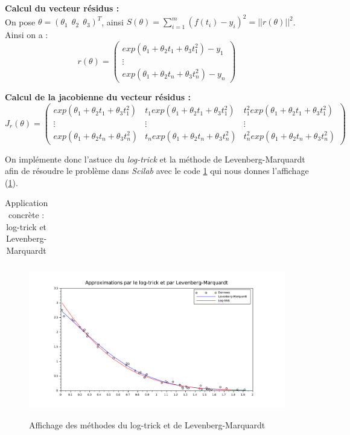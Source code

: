 \documentclass[a4paper,10pt]{report}
\begin{document}
\textbf{Calcul du vecteur résidus :}\\
On pose $\theta = (\theta_1 \ \ \theta_2 \ \ \theta_3)^T$, ainsi $S(\theta)=\sum \limits_{i=1}^m (f(t_i)-y_i)^2=||r(\theta)||^2$.
Ainsi on a :
\abovedisplayskip=0mm
\begin{displaymath}
r(\theta) = \left( \begin{array}{c} exp(\theta_1+\theta_2 t_1 + \theta_3 t_1^2) -y_1 \\
\vdots \\
exp(\theta_1+\theta_2 t_n + \theta_3 t_n^2) -y_n
 \end{array} \right)
\end{displaymath}

\textbf{Calcul de la jacobienne du vecteur résidus :}\\
\abovedisplayskip=0mm
\begin{displaymath}
J_r(\theta) = \left( \begin{array}{ccc} exp(\theta_1+\theta_2 t_1 + \theta_3 t_1^2) & t_1exp(\theta_1+\theta_2 t_1 + \theta_3 t_1^2)
& t_1^2exp(\theta_1+\theta_2 t_1 + \theta_3 t_1^2) \\
\vdots & \vdots & \vdots \\
exp(\theta_1+\theta_2 t_n + \theta_3 t_n^2) & t_nexp(\theta_1+\theta_2 t_n + \theta_3 t_n^2)
& t_n^2exp(\theta_1+\theta_2 t_n + \theta_3 t_n^2)
 \end{array} \right)
\end{displaymath}

On implémente donc l'astuce du \textit{log-trick} et la méthode de Levenberg-Marquardt afin de résoudre le problème dans \textit{Scilab} avec le code \ref{log_tric et levenberg} qui nous donnes l'affichage (\ref{graph log_tric et levenberg}).
\begin{table}[H]
\caption{Application concrète : log-trick et Levenberg-Marquardt}
\begin{tabular}{l}

\label{log_tric et levenberg}
\end{tabular}
\end{table}

\begin{figure}[H]
\centering
\caption{Affichage des méthodes du log-trick et de Levenberg-Marquardt}
\includegraphics[width=\textwidth]{PMC_non_lineaire.pdf}
\label{graph log_tric et levenberg}
\end{figure}
\end{document}
